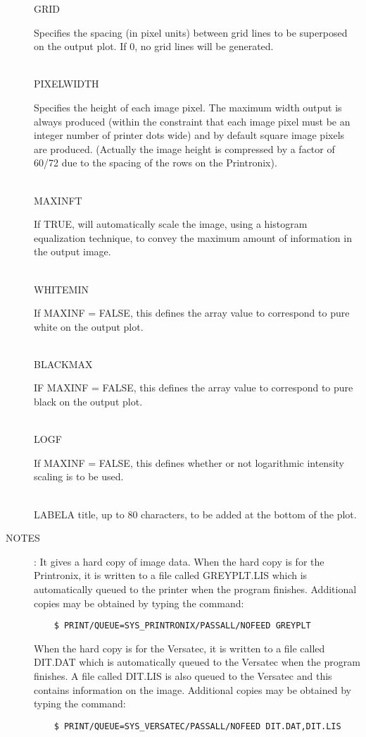 \begin{description}
\begin{tabbing}
GRID\>\begin{minipage}[t]{100mm}
Specifies the spacing (in pixel units) between grid lines to be superposed on
the output plot.
If 0, no grid lines will be generated.
\end{minipage}\\
PIXEL\>WIDTH\>\begin{minipage}[t]{100mm}
Specifies the height of each image pixel.
The maximum width output is always produced (within the constraint that each
image pixel must be an integer number of printer dots wide) and by default
square image pixels are produced.
(Actually the image height is compressed by a factor of 60/72 due to the
spacing of the rows on the Printronix).
\end{minipage}\\
MAXINF\>T\>\begin{minipage}[t]{100mm}
If TRUE, will automatically scale the image, using a histogram equalization
technique, to convey the maximum amount of information in the output image.
\end{minipage}\\
WHITE\>MIN\>\begin{minipage}[t]{100mm}
If MAXINF = FALSE, this defines the array value to correspond to pure white on
the output plot.
\end{minipage}\\
BLACK\>MAX\>\begin{minipage}[t]{100mm}
IF MAXINF = FALSE, this defines the array value to correspond to pure black on
the output plot.
\end{minipage}\\
LOG\>F\>\begin{minipage}[t]{100mm}
If MAXINF = FALSE, this defines whether or not logarithmic intensity scaling is
to be used.
\end{minipage}\\
LABEL\>\>A title, up to 80 characters, to be added at the bottom of the plot.
\end{tabbing}
\item [NOTES]:
It gives a hard copy of image data.
When the hard copy is for the Printronix, it is written to a file called
GREYPLT.LIS which is automatically queued to the printer when the program
finishes.
Additional copies may be obtained by typing the command:
\begin{verbatim}
    $ PRINT/QUEUE=SYS_PRINTRONIX/PASSALL/NOFEED GREYPLT
\end{verbatim}
When the hard copy is for the Versatec, it is written to a file called
DIT.DAT which is automatically queued to the Versatec when the program finishes.
A file called DIT.LIS is also queued to the Versatec and this contains
information on the image.
Additional copies may be obtained by typing the command:
\begin{verbatim}
    $ PRINT/QUEUE=SYS_VERSATEC/PASSALL/NOFEED DIT.DAT,DIT.LIS
\end{verbatim}
\end{description}

